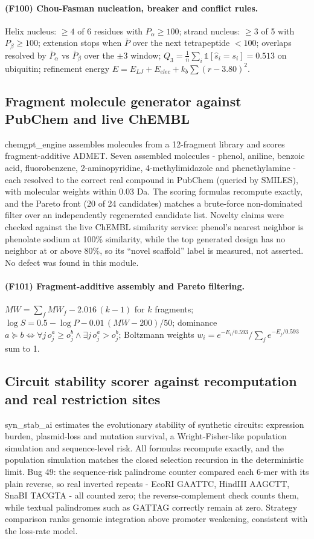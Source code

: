 \paragraph{(F100) Chou-Fasman nucleation, breaker and conflict rules.} Helix nucleus: $\ge 4$ of 6 residues with $P_\alpha\ge100$; strand nucleus: $\ge 3$ of 5 with $P_\beta\ge100$; extension stops when $\bar P$ over the next tetrapeptide $<100$; overlaps resolved by $\bar P_\alpha$ vs $\bar P_\beta$ over the $\pm3$ window; $Q_3=\frac{1}{n}\sum_i \mathbb{1}[\hat s_i=s_i]=0.513$ on ubiquitin; refinement energy $E=E_{LJ}+E_{elec}+k_b\sum(r-3.80)^2$.
\subsection{Fragment molecule generator against PubChem and live ChEMBL}
chemgpt\_engine assembles molecules from a 12-fragment library and scores fragment-additive ADMET. Seven assembled molecules - phenol, aniline, benzoic acid, fluorobenzene, 2-aminopyridine, 4-methylimidazole and phenethylamine - each resolved to the correct real compound in PubChem (queried by SMILES), with molecular weights within 0.03 Da. The scoring formulas recompute exactly, and the Pareto front (20 of 24 candidates) matches a brute-force non-dominated filter over an independently regenerated candidate list. Novelty claims were checked against the live ChEMBL similarity service: phenol's nearest neighbor is phenolate sodium at 100\% similarity, while the top generated design has no neighbor at or above 80\%, so its ``novel scaffold'' label is measured, not asserted. No defect was found in this module.
\paragraph{(F101) Fragment-additive assembly and Pareto filtering.} $MW=\sum_f MW_f-2.016\,(k-1)$ for $k$ fragments; $\log S=0.5-\log P-0.01\,(MW-200)/50$; dominance $a\succeq b\iff \forall j\,o_j^a\ge o_j^b \wedge \exists j\,o_j^a>o_j^b$; Boltzmann weights $w_i=e^{-E_i/0.593}/\sum_j e^{-E_j/0.593}$ sum to 1.
\subsection{Circuit stability scorer against recomputation and real restriction sites}
syn\_stab\_ai estimates the evolutionary stability of synthetic circuits: expression burden, plasmid-loss and mutation survival, a Wright-Fisher-like population simulation and sequence-level risk. All formulas recompute exactly, and the population simulation matches the closed selection recursion in the deterministic limit. Bug 49: the sequence-risk palindrome counter compared each 6-mer with its plain reverse, so real inverted repeats - EcoRI GAATTC, HindIII AAGCTT, SnaBI TACGTA - all counted zero; the reverse-complement check counts them, while textual palindromes such as GATTAG correctly remain at zero. Strategy comparison ranks genomic integration above promoter weakening, consistent with the loss-rate model.
